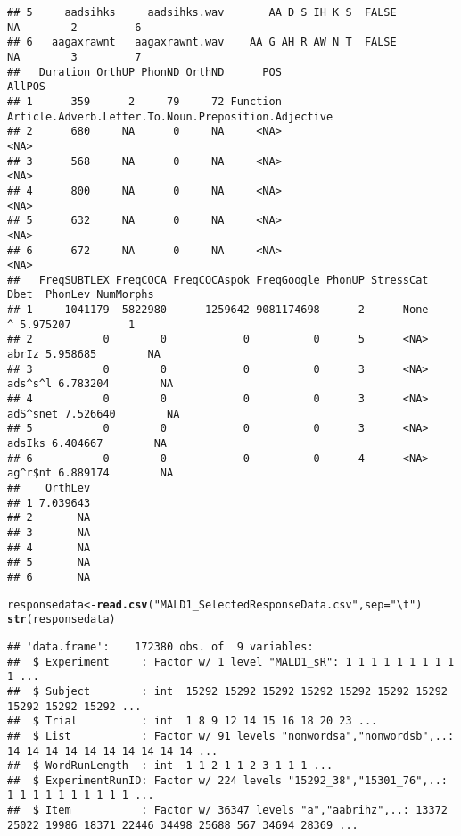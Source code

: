\documentclass{article}\usepackage[]{graphicx}\usepackage[]{color}
\makeatletter
\newcommand{\hlstr}[1]{\textcolor[rgb]{0.192,0.494,0.8}{#1}}%
\newcommand{\hlstd}[1]{\textcolor[rgb]{0.345,0.345,0.345}{#1}}%
\newcommand{\hlkwb}[1]{\textcolor[rgb]{0.69,0.353,0.396}{#1}}%
\newcommand{\hlkwc}[1]{\textcolor[rgb]{0.333,0.667,0.333}{#1}}%
\newcommand{\hlkwd}[1]{\textcolor[rgb]{0.737,0.353,0.396}{\textbf{#1}}}%
\newenvironment{kframe}{%
 \def\at@end@of@kframe{}%
 \ifinner\ifhmode%
  \def\at@end@of@kframe{\end{minipage}}%
  \begin{minipage}{\columnwidth}%
 \fi\fi%
 \def\FrameCommand##1{\hskip\@totalleftmargin \hskip-\fboxsep
 \colorbox{shadecolor}{##1}\hskip-\fboxsep
     \hskip-\linewidth \hskip-\@totalleftmargin \hskip\columnwidth}%
 \MakeFramed {\advance\hsize-\width
   \@totalleftmargin\z@ \linewidth\hsize
   \@setminipage}}%
 {\par\unskip\endMakeFramed%
 \at@end@of@kframe}
\newenvironment{knitrout}{}{} %
\makeatother
\begin{document}
\begin{knitrout}
\begin{kframe}
\begin{verbatim}
## 5     aadsihks     aadsihks.wav       AA D S IH K S  FALSE            NA        2         6
## 6   aagaxrawnt   aagaxrawnt.wav    AA G AH R AW N T  FALSE            NA        3         7
##   Duration OrthUP PhonND OrthND      POS                                              AllPOS
## 1      359      2     79     72 Function Article.Adverb.Letter.To.Noun.Preposition.Adjective
## 2      680     NA      0     NA     <NA>                                                <NA>
## 3      568     NA      0     NA     <NA>                                                <NA>
## 4      800     NA      0     NA     <NA>                                                <NA>
## 5      632     NA      0     NA     <NA>                                                <NA>
## 6      672     NA      0     NA     <NA>                                                <NA>
##   FreqSUBTLEX FreqCOCA FreqCOCAspok FreqGoogle PhonUP StressCat     Dbet  PhonLev NumMorphs
## 1     1041179  5822980      1259642 9081174698      2      None        ^ 5.975207         1
## 2           0        0            0          0      5      <NA>    abrIz 5.958685        NA
## 3           0        0            0          0      3      <NA>  ads^s^l 6.783204        NA
## 4           0        0            0          0      3      <NA> adS^snet 7.526640        NA
## 5           0        0            0          0      3      <NA>   adsIks 6.404667        NA
## 6           0        0            0          0      4      <NA>  ag^r$nt 6.889174        NA
##    OrthLev
## 1 7.039643
## 2       NA
## 3       NA
## 4       NA
## 5       NA
## 6       NA
\end{verbatim}
\begin{alltt}
\hlstd{responsedata} \hlkwb{<-} \hlkwd{read.csv}\hlstd{(}\hlstr{"MALD1_SelectedResponseData.csv"}\hlstd{,} \hlkwc{sep} \hlstd{=} \hlstr{"\textbackslash{}t"}\hlstd{)}
\hlkwd{str}\hlstd{(responsedata)}
\end{alltt}
\begin{verbatim}
## 'data.frame':	172380 obs. of  9 variables:
##  $ Experiment     : Factor w/ 1 level "MALD1_sR": 1 1 1 1 1 1 1 1 1 1 ...
##  $ Subject        : int  15292 15292 15292 15292 15292 15292 15292 15292 15292 15292 ...
##  $ Trial          : int  1 8 9 12 14 15 16 18 20 23 ...
##  $ List           : Factor w/ 91 levels "nonwordsa","nonwordsb",..: 14 14 14 14 14 14 14 14 14 14 ...
##  $ WordRunLength  : int  1 1 2 1 1 2 3 1 1 1 ...
##  $ ExperimentRunID: Factor w/ 224 levels "15292_38","15301_76",..: 1 1 1 1 1 1 1 1 1 1 ...
##  $ Item           : Factor w/ 36347 levels "a","aabrihz",..: 13372 25022 19986 18371 22446 34498 25688 567 34694 28369 ...

\end{verbatim}
\end{kframe}
\end{knitrout}
\end{document}
